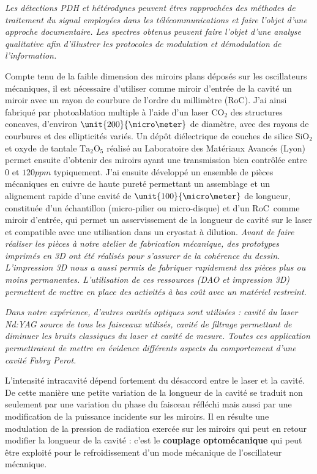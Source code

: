 \documentclass[12pt,a4paper]{article}
\newcommand{\uroc}{\micro RoC}
\begin{document}
\textit{Les détections PDH et hétérodynes peuvent êtres rapprochées des méthodes de traitement du signal employées dans les télécommunications et faire l'objet d'une approche documentaire.
Les spectres obtenus peuvent faire l'objet d'une analyse qualitative afin d'illustrer les protocoles de modulation et démodulation de l'information.}

Compte tenu de la faible dimension des miroirs plans déposés sur les oscillateurs mécaniques, il est nécessaire d'utiliser comme miroir d'entrée de la cavité un miroir avec un rayon de courbure de l'ordre du millimètre (\uroc).
J'ai ainsi fabriqué par photoablation multiple à l'aide d'un laser $\mathrm{CO_2}$ des structures concaves, d'environ $\unit{200}{\micro\meter}$ de diamètre, avec des rayons de courbures et des ellipticités variés.
Un dépôt diélectrique de couches de silice $\mathrm{SiO_2}$ et oxyde de tantale $\mathrm{Ta_2O_5}$ réalisé au Laboratoire des Matériaux Avancés (Lyon) permet ensuite d'obtenir des miroirs ayant une transmission bien contrôlée entre 0 et $\unit{120}{ppm}$ typiquement.
J'ai ensuite développé un ensemble de pièces mécaniques en cuivre de haute pureté permettant un assemblage et un alignement rapide d'une cavité de $\unit{100}{\micro\meter}$ de longueur, constituée d'un échantillon (micro-pilier ou micro-disque) et d'un \uroc\ comme miroir d'entrée, qui permet un asservissement de la longueur de cavité sur le laser et compatible avec une utilisation dans un cryostat à dilution.
\textit{Avant de faire réaliser les pièces à notre atelier de fabrication mécanique, des prototypes imprimés en 3D ont été réalisés pour s'assurer de la cohérence du dessin.
L'impression 3D nous a aussi permis de fabriquer rapidement des pièces plus ou moins permanentes.
L'utilisation de ces ressources (DAO et impression 3D) permettent de mettre en place des activités à bas coût avec un matériel restreint.}

\textit{Dans notre expérience, d'autres cavités optiques sont utilisées : cavité du laser Nd\string:YAG source de tous les faisceaux utilisés, cavité de filtrage permettant de diminuer les bruits classiques du laser et cavité de mesure.
Toutes ces application permettraient de mettre en évidence différents aspects du comportement d'une cavité Fabry Perot.}

L'intensité intracavité dépend fortement du désaccord entre le laser et la cavité.
De cette manière une petite variation de la longueur de la cavité se traduit non seulement par une variation du phase du faisceau réfléchi mais aussi par une modification de la puissance incidente sur les miroirs.
Il en résulte une modulation de la pression de radiation exercée sur les miroirs qui peut en retour modifier la longueur de la cavité : c'est le \textbf{couplage optomécanique} qui peut être exploité pour le refroidissement d'un mode mécanique de l'oscillateur mécanique.
\end{document}
